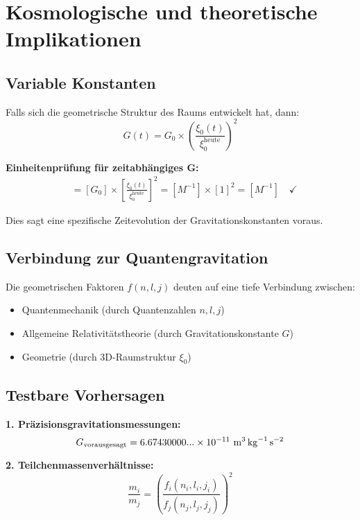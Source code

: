 \documentclass[12pt,a4paper]{article}
\newcommand{\xifunc}{f(n,l,j)}
\theoremstyle{definition}
\begin{document}
	\section{Kosmologische und theoretische Implikationen}
	
	\subsection{Variable Konstanten}
	
	Falls sich die geometrische Struktur des Raums entwickelt hat, dann:
	\begin{equation}
		G(t) = G_0 \times \left(\frac{\xi_0(t)}{\xi_0^{\text{heute}}}\right)^2
	\end{equation}
	
	\textbf{Einheitenprüfung für zeitabhängiges G:}
	\begin{align}
		[G(t)] &= [G_0] \times \left[\frac{\xi_0(t)}{\xi_0^{\text{heute}}}\right]^2 = [M^{-1}] \times [1]^2 = [M^{-1}] \quad \checkmark
	\end{align}
	
	Dies sagt eine spezifische Zeitevolution der Gravitationskonstanten voraus.
	
	\subsection{Verbindung zur Quantengravitation}
	
	Die geometrischen Faktoren $\xifunc$ deuten auf eine tiefe Verbindung zwischen:
	\begin{itemize}
		\item Quantenmechanik (durch Quantenzahlen $n,l,j$)
		\item Allgemeine Relativitätstheorie (durch Gravitationskonstante $G$)
		\item Geometrie (durch 3D-Raumstruktur $\xi_0$)
	\end{itemize}
	
	\subsection{Testbare Vorhersagen}
	
	\textbf{1. Präzisionsgravitationsmessungen:}
	\begin{equation}
		G_{\text{vorausgesagt}} = 6.67430000... \times 10^{-11} \text{ \si{\metre\cubed\per\kilogram\per\second\squared}}
	\end{equation}
	
	\textbf{2. Teilchenmassenverhältnisse:}
	\begin{equation}
		\frac{m_i}{m_j} = \left(\frac{f_i(n_i,l_i,j_i)}{f_j(n_j,l_j,j_j)}\right)^2
	\end{equation}
	
\end{document}
